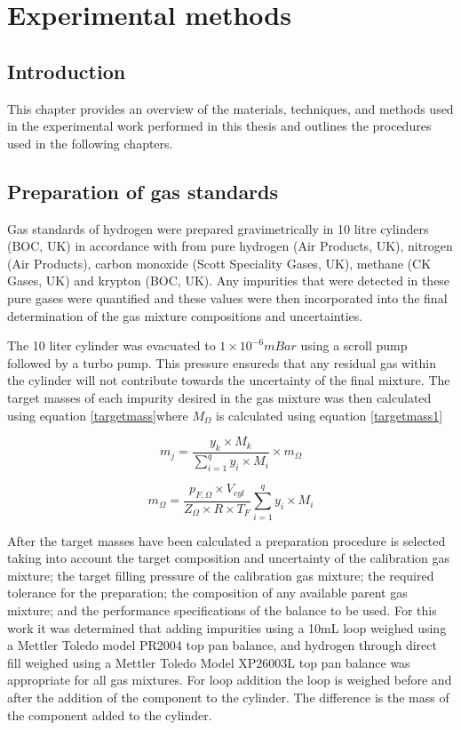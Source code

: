\chapter{Experimental methods}
\section{Introduction}
This chapter provides an overview of the materials, techniques, and methods used in the experimental work performed in this thesis and outlines the procedures used in the following chapters. 

\section{Preparation of gas standards} \label{gasprep}
Gas standards of hydrogen were prepared gravimetrically in 10 litre cylinders (BOC, UK) in accordance with \cite{InternationalStandardISO6142-1:2015} from pure hydrogen (Air Products, UK), nitrogen (Air Products), carbon monoxide (Scott Speciality Gases, UK), methane (CK Gases, UK) and krypton (BOC, UK). Any impurities that were detected in these pure gases were quantified and these values were then incorporated into the final determination of the gas mixture compositions and uncertainties. 

The 10 liter cylinder was evacuated to $1 \times 10^{-6} mBar$ using a scroll pump followed by a turbo pump. This pressure ensureds that any residual gas within the cylinder will not contribute towards the uncertainty of the final mixture. \cite{InternationalStandardISO6142-1:2015} The target masses of each impurity desired in the gas mixture was then calculated using equation \ref{targetmass}where $M_\Omega$ is calculated using equation \ref{targetmass1}

\begin{equation}\label{targetmass} 
  m_j = \frac{y_k \times M_k}{\sum_{i=1}^{q}y_i \times M_i}\times m_\Omega
\end{equation}

\begin{equation}\label{targetmass1}
  m_\Omega = \frac{p_{F, \Omega} \times V_{cyl}}{Z_\Omega \times R \times T_F}\sum_{i=1}^{q}y_i \times M_i
\end{equation}

After the target masses have been calculated a preparation procedure is selected taking into account the target composition and uncertainty of the calibration gas mixture; the target filling pressure of the calibration gas mixture; the required tolerance for the preparation; the composition of any available parent gas mixture; and the performance specifications of the balance to be used.  For this work it was determined that adding impurities using a 10mL loop weighed using a Mettler Toledo model  PR2004 top pan balance, and hydrogen through direct fill weighed using a Mettler Toledo Model XP26003L top pan balance was appropriate for all gas mixtures. For loop addition the loop is weighed before and after the addition of the component to the cylinder. The difference is the mass of the component added to the cylinder. 

